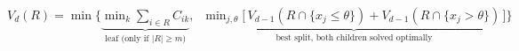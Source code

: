 \documentclass[border=2pt]{standalone}
\begin{document}
\color{ink}
$\displaystyle V_d(R)=\min\Big\{\underbrace{\min_{k}\sum_{i\in R}C_{ik}}_{\text{leaf (only if }|R|\ge m)},\;\;\underbrace{\min_{j,\theta}\big[\,V_{d-1}(R\cap\{x_j\le\theta\})+V_{d-1}(R\cap\{x_j>\theta\})\,\big]}_{\text{best split, both children solved optimally}}\Big\}$
\end{document}
